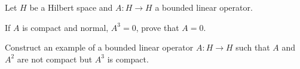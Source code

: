 Let $H$ be a Hilbert space and $A:H\rightarrow H$ a bounded linear
operator.
\begin{alist}
\item If $A$ is compact and normal, $A^3=0$, prove that $A=0$.
\item Construct an example of a bounded linear operator
$A:H\rightarrow H$ such that $A$ and $A^2$ are not compact but $A^3$
is compact.
\end{alist}
